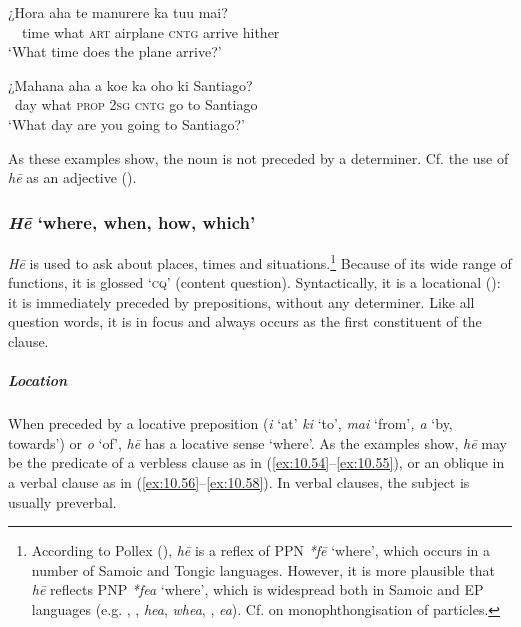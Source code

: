 \ea\label{ex:10.52}
\gll ¿Hora aha te manurere ka tu{\ꞌ}u mai? \\
~~time what \textsc{art} airplane \textsc{cntg} arrive hither \\

\glt 
‘What time does the plane arrive?’ \textstyleExampleref{[R208.214]} 
\z

\ea\label{ex:10.53}
\gll ¿Mahana aha a koe ka oho ki Santiago? \\
~day what \textsc{prop} \textsc{2sg} \textsc{cntg} go to Santiago \\

\glt
‘What day are you going to Santiago?’ \textstyleExampleref{[R208.226]} 
\z

As these examples show, the noun is not preceded by a determiner. Cf. the use of \textit{hē} as an adjective (). 

\subsubsection{\textit{Hē} ‘where, when, how, which’}\label{sec:10.3.2.3}
\textit{Hē} is used to ask about places, times and situations.\footnote{\label{fn:490}According to Pollex (\citealt{GreenhillClark2011}), \textit{hē} is a reflex of PPN \textit{*fē} ‘where’, which occurs in a number of Samoic and Tongic languages. However, it is more plausible that \textit{hē} reflects PNP \textit{*fea} ‘where’, which is widespread both in Samoic and EP languages (e.g. , ,  \textit{hea},  \textit{whea}, ,  \textit{{\ꞌ}ea}). Cf.  on monophthongisation of particles.} Because of its wide range of functions, it is glossed ‘\textsc{cq}’ (content question). Syntactically, it is a locational (): it is immediately preceded by prepositions, without any determiner. Like all question words, it is in focus and always occurs as the first constituent of the clause.

\subparagraph{Location} When preceded by a locative preposition (\textit{{\ꞌ}i} ‘at’ \textit{ki} ‘to’, \textit{mai} ‘from’\textit{, a} ‘by, towards’) or \textit{o} ‘of’, \textit{hē} has a locative sense ‘where’. As the examples show, \textit{hē} may be the predicate of a verbless clause as in (\ref{ex:10.54}–\ref{ex:10.55}), or an oblique in a verbal clause as in (\ref{ex:10.56}–\ref{ex:10.58}). In verbal clauses, the subject is usually preverbal.

